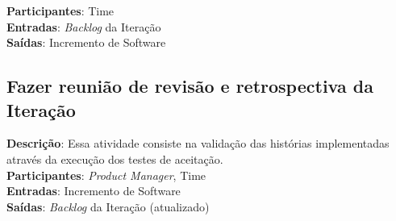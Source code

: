   \textbf{Participantes}: Time\\
  
  \textbf{Entradas}: \textit{Backlog} da Iteração \\
  
  \textbf{Saídas}:   Incremento de Software\\
  
\subsection{Fazer reunião de revisão e retrospectiva da Iteração}
  \textbf{Descrição}: Essa atividade consiste na validação das histórias implementadas através da execução dos testes de aceitação. \\
  
  \textbf{Participantes}: \textit{Product Manager}, Time\\
  
  \textbf{Entradas}: Incremento de Software \\
  
  \textbf{Saídas}:   \textit{Backlog} da Iteração (atualizado)\\
